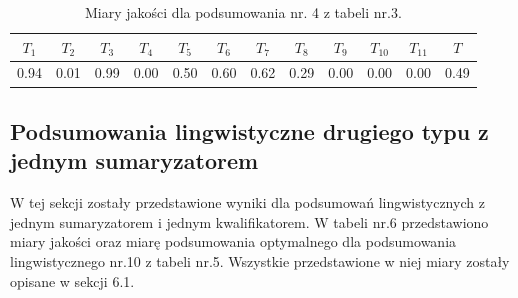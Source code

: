 \documentclass{article}
\begin{document}
\begin{table}[H]
    \centering
    \begin{tabular}{|c|c|c|c|c|c|c|c|c|c|c|c|}
    \hline
    \textbf{\(T_1\)} &\textbf{\(T_2\)} & \textbf{\(T_3\)} & \textbf{\(T_4\)} & \textbf{\(T_5\)} & \textbf{\(T_6\)} & \textbf{\(T_7\)} & \textbf{\(T_8\)} & \textbf{\(T_9\)} & \textbf{\(T_{10}\)} & \textbf{\(T_{11}\)} & \textbf{\(T\)} \\ \hline
    0.94 & 0.01 & 0.99 & 0.00 & 0.50 & 0.60 & 0.62 & 0.29 & 0.00 & 0.00 & 0.00 & 0.49 \\ \hline
    \end{tabular}
    \caption{Miary jakości dla podsumowania nr. 4 z tabeli nr.3.}
\end{table}  


\subsection{Podsumowania lingwistyczne drugiego typu z jednym sumaryzatorem}
W tej sekcji zostały przedstawione wyniki dla podsumowań lingwistycznych z jednym sumaryzatorem i jednym kwalifikatorem. W tabeli nr.6 przedstawiono miary jakości oraz miarę podsumowania optymalnego dla podsumowania lingwistycznego nr.10 z tabeli nr.5. Wszystkie przedstawione w niej miary zostały opisane w sekcji 6.1. 
\end{document}
